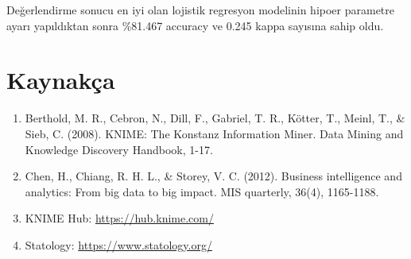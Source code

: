 \documentclass{article}
\begin{document}
Değerlendirme sonucu en iyi olan lojistik regresyon modelinin hipoer parametre ayarı yapıldıktan sonra \%81.467 accuracy ve 0.245 kappa sayısına sahip oldu.

\clearpage
\section{Kaynakça}
\begin{enumerate}
    \item Berthold, M. R., Cebron, N., Dill, F., Gabriel, T. R., Kötter, T., Meinl, T., \& Sieb, C. (2008). KNIME: The Konstanz Information Miner. Data Mining and Knowledge Discovery Handbook, 1-17.
    \item Chen, H., Chiang, R. H. L., \& Storey, V. C. (2012). Business intelligence and analytics: From big data to big impact. MIS quarterly, 36(4), 1165-1188.
    \item KNIME Hub: \href{https://hub.knime.com/}{https://hub.knime.com/}
    \item Statology: \href{https://www.statology.org/}{https://www.statology.org/}
\end{enumerate}
\end{document}
